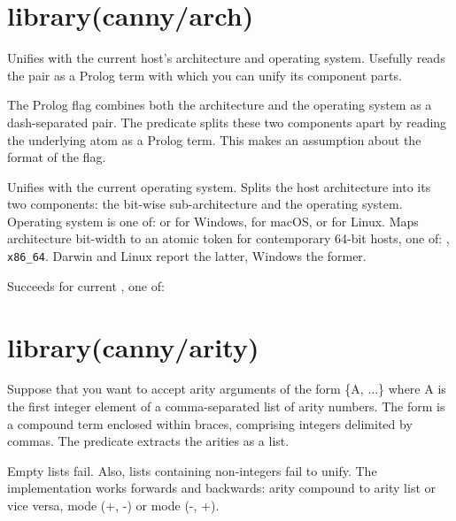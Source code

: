 \chapter{library(canny/arch)}\label{sec:arch}

\begin{description}
Unifies  with the current host's architecture and operating
system. Usefully reads the pair as a Prolog term with which you can
unify its component parts.

The Prolog  flag combines both the architecture and the
operating system as a dash-separated pair. The predicate splits
these two components apart by reading the underlying atom as a
Prolog term. This makes an assumption about the format of the 
flag.

Unifies  with the current operating system. Splits the host
architecture into its two components: the bit-wise sub-architecture
and the operating system. Operating system is one of:  or
 for Windows,  for macOS, or  for Linux. Maps
architecture bit-width to an atomic  token for contemporary
64-bit hosts, one of: , \verb$x86_64$. Darwin and Linux report the
latter, Windows the former.

Succeeds for current , one of:

\begin{shortlist}
    \item {}
    \item {}
    \item {}
    \item {}
\end{shortlist}
\end{description}

\chapter{library(canny/arity)}\label{sec:arity}

\begin{description}
Suppose that you want to accept arity arguments of the form \{A, ...\}
where A is the first integer element of a comma-separated list of
arity numbers. The  form is a compound term enclosed within
braces, comprising integers delimited by commas. The 
predicate extracts the arities as a list.

Empty lists fail. Also, lists containing non-integers fail to unify.
The implementation works forwards and backwards: arity compound to
arity list or vice versa, mode (+, -) or mode (-, +).
\end{description}

